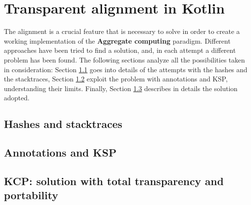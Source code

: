 \chapter{Transparent alignment in Kotlin}\label{chapter:alignment}
The alignment is a crucial feature that is necessary to solve in order to create a working implementation of the \textbf{Aggregate computing} paradigm. Different approaches have been tried to find a solution, and, in each attempt a different problem has been found. The following sections analyze all the possibilities taken in consideration: Section \ref{section:hashes_stacktraces} goes into details of the attempts with the hashes and the stacktraces, Section \ref{section_annotation_ksp} exploit the problem with annotations and KSP, understanding their limits. Finally, Section \ref{section:compiler_plugin_solution} describes in details the solution adopted.

\section{Hashes and stacktraces}\label{section:hashes_stacktraces}
\section{Annotations and KSP}\label{section_annotation_ksp}
\section{KCP: solution with total transparency and portability}\label{section:compiler_plugin_solution}